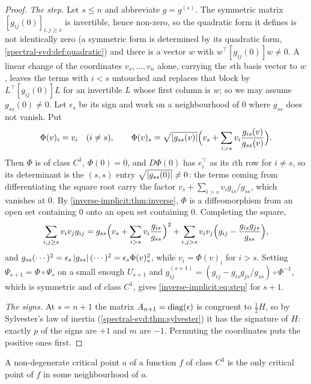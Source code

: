 \begin{notechapter}
\begin{proof}
\emph{The step.} Let $s\leq n$ and abbreviate $g = g^{(s)}$. The
symmetric matrix $[g_{ij}(0)]_{i,j\geq s}$ is invertible, hence
non-zero, so the quadratic form it defines is not identically zero
(a symmetric form is determined by its quadratic form,
\cref{spectral-svd:def:quadratic}) and there is a vector $w$ with
$w^\top[g_{ij}(0)]w\neq0$. A linear change of the coordinates
$v_s,\dots,v_n$ alone, carrying the $s$th basis vector to $w$, leaves
the terms with $i < s$ untouched and replaces that block by
$L^\top[g_{ij}(0)]L$ for an invertible $L$ whose first column is $w$; so
we may assume $g_{ss}(0)\neq0$. Let $\epsilon_s$ be its sign and work on
a neighbourhood of $0$ where $g_{ss}$ does not vanish. Put
\[
  \Phi(v)_i = v_i \quad(i\neq s) ,
  \qquad
  \Phi(v)_s = \sqrt{\left|g_{ss}(v)\right|}
  \Bigl(v_s + \sum_{i>s}v_i\frac{g_{is}(v)}{g_{ss}(v)}\Bigr) .
\]
Then $\Phi$ is of class $C^1$, $\Phi(0) = 0$, and $D\Phi(0)$ has
$e_i^\top$ as its $i$th row for $i\neq s$, so its determinant is the
$(s, s)$ entry $\sqrt{\left|g_{ss}(0)\right|}\neq0$: the terms coming from
differentiating the square root carry the factor
$v_s + \sum_{i>s}v_ig_{is}/g_{ss}$, which vanishes at $0$. By
\cref{inverse-implicit:thm:inverse}, $\Phi$ is a diffeomorphism from an
open set containing $0$ onto an open set containing $0$. Completing the
square,
\[
  \sum_{i,j\geq s}v_iv_jg_{ij}
  = g_{ss}\Bigl(v_s + \sum_{i>s}v_i\frac{g_{is}}{g_{ss}}\Bigr)^2
  + \sum_{i,j>s}v_iv_j
    \Bigl(g_{ij} - \frac{g_{is}g_{js}}{g_{ss}}\Bigr) ,
\]
and $g_{ss}(\cdots)^2 = \epsilon_s\left|g_{ss}\right|(\cdots)^2
= \epsilon_s\Phi(v)_s^2$, while $v_i = \Phi(v)_i$ for $i > s$. Setting
$\Psi_{s+1} = \Phi\circ\Psi_s$ on a small enough $U_{s+1}$ and
$g^{(s+1)}_{ij} = (g_{ij} - g_{is}g_{js}/g_{ss})\circ\Phi^{-1}$, which
is symmetric and of class $C^1$, gives
\eqref{inverse-implicit:eq:step} for $s + 1$.

\emph{The signs.} At $s = n + 1$ the matrix $A_{n+1} = \operatorname{diag}(\epsilon)$
is congruent to $\frac12H$, so by Sylvester's law of inertia
(\cref{spectral-svd:thm:sylvester}) it has the signature of $H$:
exactly $p$ of the signs are $+1$ and $m$ are $-1$. Permuting the
coordinates puts the positive ones first.
\end{proof}

\begin{corollary}
\label{inverse-implicit:cor:isolated}
A non-degenerate critical point $a$ of a function $f$ of class $C^3$ is
the only critical point of $f$ in some neighbourhood of $a$.
\end{corollary}


\end{notechapter}
